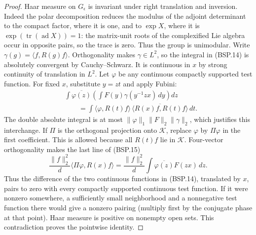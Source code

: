 \begin{proof}
Haar measure on $G_\epsilon$ is invariant under right translation and
inversion.  Indeed the polar decomposition reduces the modulus of the
adjoint determinant to the compact factor, where it is one, and to
$\exp X$, where it is $\exp(\operatorname{tr}(\operatorname{ad}X))=1$:
the matrix-unit roots of the complexified Lie algebra occur in opposite
pairs, so the trace is zero.  Thus the group is unimodular.
Write $\gamma(g)=\langle f,R(g)f\rangle$.
Orthogonality makes $\gamma\in L^2$, so the integral in (BSP.14)
is absolutely convergent by Cauchy--Schwarz.  It is continuous in $x$
by strong continuity of translation in $L^2$.
Let $\varphi$ be any continuous compactly supported test function.
For fixed $x$, substitute $y=zt$ and apply Fubini:
\[
 \begin{split}
 &\int \overline{\varphi(z)}
       \left(\int F(y)\gamma(y^{-1}zx)\,dy\right)dz\\
 &\qquad=\int
       \langle\varphi,R(t)f\rangle\,
       \overline{\langle R(x)f,R(t)f\rangle}\,dt.
 \end{split}
 \tag{BSP.15}
\]
The double absolute integral is at most
$\|\varphi\|_1\|F\|_2\|\gamma\|_2$, which justifies this interchange.
If $\Pi$ is the orthogonal projection onto $\mathcal K$, replace
$\varphi$ by $\Pi\varphi$ in the first coefficient.  This is allowed
because all $R(t)f$ lie in $\mathcal K$.
Four-vector orthogonality makes the last line of (BSP.15)
\[
 \frac{\|f\|_2^2}{d}\langle\Pi\varphi,R(x)f\rangle
       =\frac{\|f\|_2^2}{d}
          \int\overline{\varphi(z)}F(zx)\,dz.
\]
Thus the difference of the two continuous functions in (BSP.14),
translated by $x$, pairs to zero with every compactly supported
continuous test function.  If it were nonzero somewhere, a sufficiently
small neighborhood and a nonnegative test function there would give
a nonzero pairing (multiply first by the conjugate phase at that
point).  Haar measure is positive on nonempty open sets.  This
contradiction proves the pointwise identity.
\end{proof}

